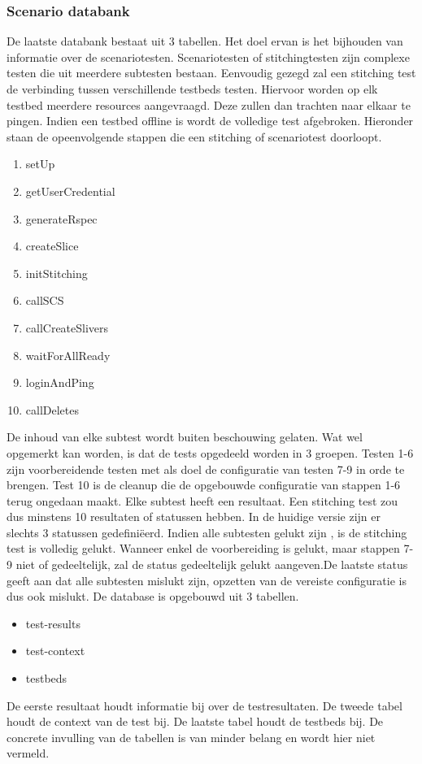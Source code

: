 \subsubsection{Scenario databank}
\npar
De laatste databank bestaat uit 3 tabellen. Het doel ervan is het bijhouden van informatie over de scenariotesten. Scenariotesten of stitchingtesten zijn complexe testen die uit meerdere subtesten bestaan. Eenvoudig gezegd zal een stitching test de verbinding tussen verschillende testbeds testen. Hiervoor worden op elk testbed meerdere resources aangevraagd. Deze zullen dan trachten naar elkaar te pingen. Indien een testbed offline is wordt de volledige test afgebroken. 
\clearpage
Hieronder staan de opeenvolgende stappen die een stitching of scenariotest doorloopt.
\begin{enumerate}
\item setUp
\item getUserCredential
\item generateRspec
\item createSlice
\item initStitching
\item callSCS
\item callCreateSlivers
\item waitForAllReady
\item loginAndPing
\item callDeletes
\end{enumerate}
De inhoud van elke subtest wordt buiten beschouwing gelaten.
Wat wel opgemerkt kan worden, is dat de tests opgedeeld worden in 3 groepen. Testen 1-6 zijn voorbereidende testen met als doel de configuratie van testen 7-9 in orde te brengen. Test 10 is de cleanup die de opgebouwde configuratie van stappen 1-6 terug ongedaan maakt.
Elke subtest heeft een resultaat. Een stitching test zou dus minstens 10 resultaten of statussen hebben. In de huidige versie zijn er slechts 3 statussen gedefini\"eerd. Indien alle subtesten gelukt zijn , is de stitching test is volledig gelukt. Wanneer enkel de voorbereiding is gelukt, maar stappen 7-9 niet of gedeeltelijk, zal de status gedeeltelijk gelukt aangeven.De laatste status geeft aan dat alle subtesten mislukt zijn, opzetten van de vereiste configuratie is dus ook mislukt.
\npar
De database is opgebouwd uit 3 tabellen.
\begin{itemize}
\item test-results
\item test-context
\item testbeds
\end{itemize}
De eerste resultaat houdt informatie bij over de testresultaten. De tweede tabel houdt de context van de test bij. De laatste tabel houdt de testbeds bij. De concrete invulling van de tabellen is van minder belang en wordt hier niet vermeld.
\clearpage
